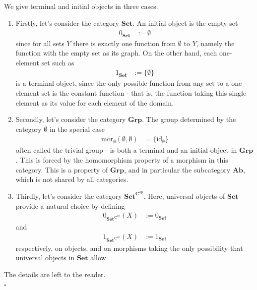 \begin{exa}
\label{exa:uniobj}
We give terminal and initial objects in three cases.
\begin{enumerate}
\item[(a)]
Firstly, let's consider the category $\mathbf{Set}$.
An initial object is the empty set
\begin{align*}
  0_{\mathbf{Set}}
  &:=
  \emptyset
\end{align*}
since for all sets $Y$ there is exactly one function from $\emptyset$ to $Y$, namely the function with the empty set as its graph.
On the other hand, each one-element set such as
\begin{align*}
  1_{\mathbf{Set}}
  &:=
  \lbrace
    \emptyset
  \rbrace
\end{align*}
is a terminal object, since the only possible function from any set to a one-element set is the constant function - that is, the function taking this single element as its value for each element of the domain.
\item[(b)]
Secondly, let's consider the category $\mathbf{Grp}$.
The group determined by the category $\pmb{\emptyset}$ in the special case
\begin{align*}
  \mathrm{mor}_{\pmb{\emptyset}}(\emptyset,\emptyset)
  &=
  \lbrace
    \mathrm{id}_{\emptyset}
  \rbrace
\end{align*}
often called the trivial group - is both a terminal and an initial object in $\mathbf{Grp}$.
This is forced by the homomorphism property of a morphism in this category.
This is a property of $\mathbf{Grp}$, and in particular the subcategory $\mathbf{Ab}$, which is not shared by all categories.
\item[(c)]
Thirdly, let's consider the category $\mathbf{Set}^{\mathbf{C}^{\mathrm{op}}}$.
Here, universal objects of $\mathbf{Set}$ provide a natural choice by defining
\begin{align*}
  0_{\mathbf{Set}^{\mathbf{C}^{\mathrm{op}}}}(X)
  &:=
  0_{\mathbf{Set}}
\end{align*}
and
\begin{align*}
  1_{\mathbf{Set}^{\mathbf{C}^{\mathrm{op}}}}(X)
  &:=
  1_{\mathbf{Set}}
\end{align*}
respectively, on objects, and on morphisms taking the only possibility that universal objects in $\mathbf{Set}$ allow.
\end{enumerate}
\end{exa}
\begin{prf}
The details are left to the reader.
\\
\phantom{proven}
\hfill
$\square$
\end{prf}
